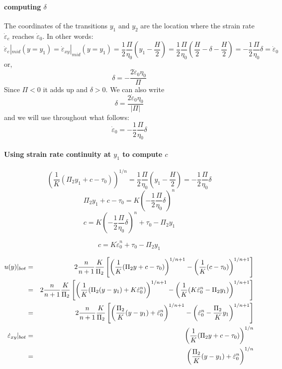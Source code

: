 \paragraph{computing $\delta$}

The coordinates of the transitions $y_1$ and $y_2$ are the location where the strain rate
$\dot{\varepsilon}_e$ reaches $\dot{\varepsilon}_0$. In other words:
\[
\dot{\varepsilon}_{e}|_{mid}(y=y_1) = 
\dot{\varepsilon}_{xy}|_{mid}(y=y_1)  
= \frac{1}{2} \frac{\Pi}{\eta_0} \left(y_1  -\frac{H}{2} \right)
= \frac{1}{2} \frac{\Pi}{\eta_0} \left(\frac{H}{2}-\delta  -\frac{H}{2} \right)
= -\frac{1}{2} \frac{\Pi}{\eta_0} \delta
= \dot{\varepsilon}_0
\]
or, 
\[
\delta = -\frac{2 \dot{\varepsilon}_0 \eta_0}{\Pi}
\]
Since $\Pi<0$ it adds up and $\delta>0$. We can also write
\[
\boxed{
\delta = \frac{2 \dot{\varepsilon}_0 \eta_0}{|\Pi|}
}
\]
and we will use throughout what follows:
\[
\dot{\varepsilon}_0 = - \frac{1}{2}\frac{\Pi}{\eta_0} \delta
\]


\paragraph{Using strain rate continuity at $y_1$ to compute $c$}
\[
\left( \frac{1}{K} ( \Pi_2 y_1 +c -\tau_0 ) \right)^{1/n}
= \frac{1}{2} \frac{\Pi}{\eta_0} \left(y_1  -\frac{H}{2} \right)
=- \frac{1}{2} \frac{\Pi}{\eta_0} \delta
\]
\[
 \Pi_2 y_1 +c -\tau_0 
= K\left( - \frac{1}{2} \frac{\Pi}{\eta_0} \delta\right)^{n}
\]
\[
c = K\left( - \frac{1}{2} \frac{\Pi}{\eta_0} \delta\right)^{n} + \tau_0 -\Pi_2 y_1
\]

\[
\boxed{
c = K \dot{\varepsilon}_0^{n} + \tau_0 -\Pi_2 y_1
}
\]




\begin{eqnarray}
u(y)|_{bot} 
&=& 
2 \frac{n}{n+1} \frac{K}{\Pi_2} \left[ \left( \frac{1}{K} ( \Pi_2 y +c -\tau_0 ) \right)^{1/n+ 1 } 
- \left( \frac{1}{K} ( c -\tau_0 ) \right)^{1/n+ 1 } \right]
\nonumber\\
&=& 2 \frac{n}{n+1} \frac{K}{\Pi_2} 
\left[ \left( \frac{1}{K} ( \Pi_2 (y-y_1) +K \dot{\varepsilon}_0^{n}   ) \right)^{1/n+ 1 } 
- \left( \frac{1}{K} (  K  
\dot{\varepsilon}_0^{n}  -\Pi_2 y_1    ) \right)^{1/n+ 1 } \right]
\nonumber\\
&=& 
2 \frac{n}{n+1} \frac{K}{\Pi_2} \left[ \left( \frac{\Pi_2}{K} (y-y_1) 
+ \dot{\varepsilon}_0^{n}    \right)^{1/n+ 1 } 
- \left(  \dot{\varepsilon}_0^{n}  - \frac{\Pi_2}{K}y_1     \right)^{1/n+ 1 } \right]
\nonumber\\
\dot{\varepsilon}_{xy}|_{bot}
&=& \left( \frac{1}{K} ( \Pi_2 y +c -\tau_0 ) \right)^{1/n} \nonumber\\
&=& \left( \frac{\Pi_2}{K} (y-y_1) + \dot{\varepsilon}_0^{n}   \right)^{1/n} \nonumber
\end{eqnarray}




